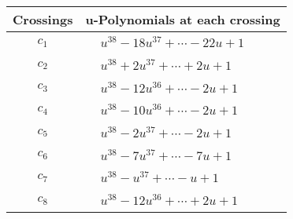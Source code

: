 \documentclass[1p]{elsarticle_modified}
\theoremstyle{definition}
\begin{document}
\begin{tabular}{m{50pt}|m{274pt}}
Crossings & \hspace{64pt}u-Polynomials at each crossing \\
\hline $$\begin{aligned}c_{1}\end{aligned}$$&$\begin{aligned}
&u^{38}-18 u^{37}+\cdots-22 u+1
\end{aligned}$\\
\hline $$\begin{aligned}c_{2}\end{aligned}$$&$\begin{aligned}
&u^{38}+2 u^{37}+\cdots+2 u+1
\end{aligned}$\\
\hline $$\begin{aligned}c_{3}\end{aligned}$$&$\begin{aligned}
&u^{38}-12 u^{36}+\cdots-2 u+1
\end{aligned}$\\
\hline $$\begin{aligned}c_{4}\end{aligned}$$&$\begin{aligned}
&u^{38}-10 u^{36}+\cdots-2 u+1
\end{aligned}$\\
\hline $$\begin{aligned}c_{5}\end{aligned}$$&$\begin{aligned}
&u^{38}-2 u^{37}+\cdots-2 u+1
\end{aligned}$\\
\hline $$\begin{aligned}c_{6}\end{aligned}$$&$\begin{aligned}
&u^{38}-7 u^{37}+\cdots-7 u+1
\end{aligned}$\\
\hline $$\begin{aligned}c_{7}\end{aligned}$$&$\begin{aligned}
&u^{38}- u^{37}+\cdots- u+1
\end{aligned}$\\
\hline $$\begin{aligned}c_{8}\end{aligned}$$&$\begin{aligned}
&u^{38}-12 u^{36}+\cdots+2 u+1
\end{aligned}$\\

\end{tabular}
\end{document}
